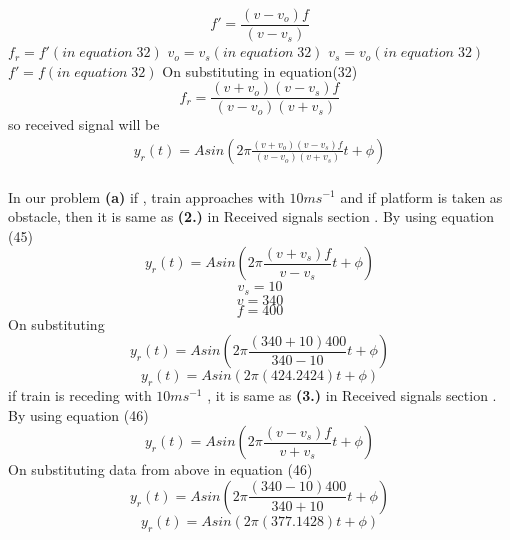 \documentclass[journal,12pt,twocolumn]{IEEEtran}
\theoremstyle{remark}
\begin{document}
 $$f' = \frac{(v-v_o) f}{(v-v_s) }$$
 $f_r=f'(in \;equation\; 32)$
 $v_o=v_s(in\; equation\; 32)$
 $v_s=v_o(in\; equation\; 32)$
 $f'=f(in\; equation \;32)$
 On substituting in equation(32)
 $$f_r = \frac{(v+v_o)(v-v_s) f}{(v- v_o)(v+v_s) }$$
  so received signal will be
 \begin{align}y_r(t) = Asin( 2 \pi  \frac{(v+v_o)(v-v_s) f}{(v- v_o)(v+v_s) }t + \phi )\end{align}
 \\
 In our problem \textbf{(a)} if , train approaches with $10 ms^{-1} $ and if platform is taken as obstacle, then it is same as \textbf{(2.) }in Received signals section . By using equation (45)$$y_r(t) = Asin( 2 \pi  \frac{(v+v_s) f}{v- v_s }t + \phi )$$
 $$v_s=10$$
  $$v=340$$
 $$f=400$$
 On substituting
 $$y_r(t) = Asin( 2 \pi  \frac{(340+10) 400}{340- 10 }t + \phi )$$
 $$y_r(t) = Asin( 2 \pi  (424.2424)t + \phi )$$
 if train is receding with $10 ms^{-1} $ , it is same as \textbf{(3.) }in Received signals section . By using equation (46)$$y_r(t) = Asin( 2 \pi  \frac{(v-v_s) f}{v+ v_s }t + \phi )$$
 On substituting data from above in equation (46)
 $$y_r(t) = Asin( 2 \pi  \frac{(340-10) 400}{340+ 10 }t + \phi )$$
 $$y_r(t) = Asin( 2 \pi  (377.1428)t + \phi )$$
\end{document}
